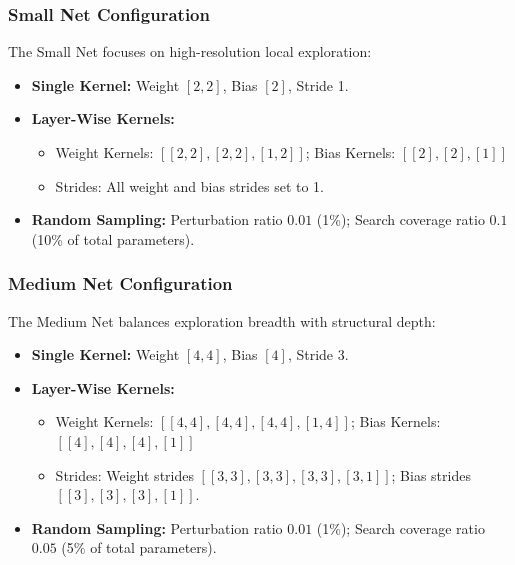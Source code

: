 \subsubsection{Small Net Configuration}
The Small Net focuses on high-resolution local exploration:
\begin{itemize}
    \item \textbf{Single Kernel:} Weight $[2,2]$, Bias $[2]$, Stride 1.
    \item \textbf{Layer-Wise Kernels:} 
        \begin{itemize}
            \item Weight Kernels: $[[2,2], [2,2], [1,2]]$; Bias Kernels: $[[2], [2], [1]]$
            \item Strides: All weight and bias strides set to 1.
        \end{itemize}
    \item \textbf{Random Sampling:} Perturbation ratio $0.01$ (1\%); Search coverage ratio $0.1$ (10\% of total parameters).
\end{itemize}

\subsubsection{Medium Net Configuration}
The Medium Net balances exploration breadth with structural depth:
\begin{itemize}
    \item \textbf{Single Kernel:} Weight $[4,4]$, Bias $[4]$, Stride 3.
    \item \textbf{Layer-Wise Kernels:} 
        \begin{itemize}
            \item Weight Kernels: $[[4,4], [4,4], [4,4], [1,4]]$; Bias Kernels: $[[4], [4], [4], [1]]$
            \item Strides: Weight strides $[[3,3], [3,3], [3,3], [3,1]]$; Bias strides $[[3], [3], [3], [1]]$.
        \end{itemize}
    \item \textbf{Random Sampling:} Perturbation ratio $0.01$ (1\%); Search coverage ratio $0.05$ (5\% of total parameters).
\end{itemize}

